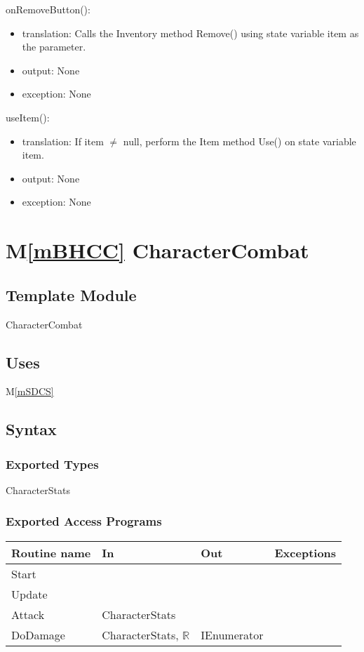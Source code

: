 \documentclass[12pt]{article}
\newcommand{\mref}[1]{M\ref{#1}}
\begin{document}
\noindent onRemoveButton():
\begin{itemize}
\item translation: Calls the Inventory method Remove() using state variable item as the parameter.
\item output: None
\item exception: None
\end{itemize}

\noindent useItem():
\begin{itemize}
\item translation: If item $\neq$ null, perform the Item method Use() on state variable item.
\item output: None
\item exception: None
\end{itemize}

\newpage

\section* {\mref{mBHCC} CharacterCombat}

\subsection*{Template Module}

CharacterCombat

\subsection* {Uses}

\mref{mSDCS}

\subsection* {Syntax}

\subsubsection* {Exported Types}

CharacterStats

\subsubsection* {Exported Access Programs}

\begin{tabular}{| l | l | l | l |}
\hline
\textbf{Routine name} & \textbf{In} & \textbf{Out} & \textbf{Exceptions}\\
\hline
Start & ~ & ~  & ~\\
Update & ~ & ~ & ~\\
Attack & CharacterStats & ~ & ~\\
DoDamage & CharacterStats, $\mathbb{R}$ & IEnumerator & ~\\
\hline
\end{tabular}
\end{document}
